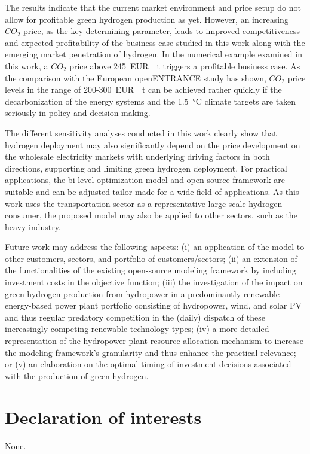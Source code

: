 \documentclass[review]{elsarticle}
\begin{document}
The results indicate that the current market environment and price setup do not allow for profitable green hydrogen production as yet. However, an increasing $CO_2$ price, as the key determining parameter, leads to improved competitiveness and expected profitability of the business case studied in this work along with the emerging market penetration of hydrogen. In the numerical example examined in this work, a $CO_2$ price above \SI{245}{EUR \per t} triggers a profitable business case. As the comparison with the European {openENTRANCE} study has shown, $CO_2$ price levels in the range of \SI{200}{}-\SI{300}{EUR \per \tonne} can be achieved rather quickly if the decarbonization of the energy systems and the \SI{1.5}{\degreeCelsius} climate targets are taken seriously in policy and decision making.\vspace{0.3cm} 

The different sensitivity analyses conducted in this work clearly show that hydrogen deployment may also significantly depend on the price development on the wholesale electricity markets with underlying driving factors in both directions, supporting and limiting green hydrogen deployment. For practical applications, the bi-level optimization model and open-source framework are suitable and can be adjusted tailor-made for a wide field of applications. As this work uses the transportation sector as a representative large-scale hydrogen consumer, the proposed model may also be applied to other sectors, such as the heavy industry.\vspace{0.3cm}

Future work may address the following aspects: (i) an application of the model to other customers, sectors, and portfolio of customers/sectors; (ii) an extension of the functionalities of the existing open-source modeling framework by including investment costs in the objective function; (iii) the investigation of the impact on green hydrogen production from hydropower in a predominantly renewable energy-based power plant portfolio consisting of hydropower, wind, and solar PV and thus regular predatory competition in the (daily) dispatch of these increasingly competing renewable technology types; (iv) a more detailed representation of the hydropower plant resource allocation mechanism to increase the modeling framework's granularity and thus enhance the practical relevance; or (v) an elaboration on the optimal timing of investment decisions associated with the production of green hydrogen.

\section*{Declaration of interests}
None.
\end{document}
